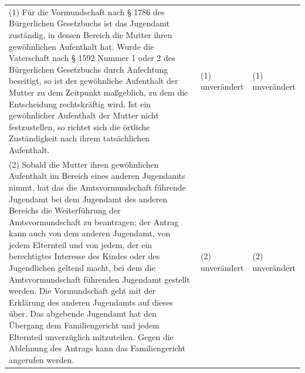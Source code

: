 \documentclass[10pt,a4paper,landscape]{article}
\begin{document}
\begin{longtable}{|L{8.2cm}|L{8.2cm}|L{8.2cm}|}
\hhline{|---|}
(1) Für die Vormundschaft nach \S{} 1786 des  \newline Bürgerlichen Gesetzbuchs ist das  \newline Jugendamt zuständig, in dessen Bereich  \newline die Mutter ihren gewöhnlichen Aufenthalt  \newline hat. Wurde die Vaterschaft nach \S{} 1592  \newline Nummer 1 oder 2 des Bürgerlichen  \newline Gesetzbuchs durch Anfechtung beseitigt,  \newline so ist der gewöhnliche Aufenthalt der  \newline Mutter zu dem Zeitpunkt maßgeblich, zu  \newline dem die Entscheidung rechtskräftig wird.  \newline Ist ein gewöhnlicher Aufenthalt der Mutter  \newline nicht festzustellen, so richtet sich die  \newline örtliche Zuständigkeit nach ihrem  \newline tatsächlichen Aufenthalt. & (1) unverändert & (1) unverändert \\
\hhline{|---|}
(2) Sobald die Mutter ihren gewöhnlichen  \newline Aufenthalt im Bereich eines anderen  \newline Jugendamts nimmt, hat das die  \newline Amtsvormundschaft führende Jugendamt  \newline bei dem Jugendamt des anderen Bereichs  \newline die Weiterführung der Amtsvormundschaft  \newline zu beantragen; der Antrag kann auch von  \newline dem anderen Jugendamt, von jedem  \newline Elternteil und von jedem, der ein  \newline berechtigtes Interesse des Kindes oder des  \newline Jugendlichen geltend macht, bei dem die  \newline Amtsvormundschaft führenden Jugendamt  \newline gestellt werden. Die Vormundschaft geht  \newline mit der Erklärung des anderen Jugendamts  \newline auf dieses über. Das abgebende  \newline Jugendamt hat den Übergang dem  \newline Familiengericht und jedem Elternteil  \newline unverzüglich mitzuteilen. Gegen die  \newline Ablehnung des Antrags kann das  \newline Familiengericht angerufen werden. & (2) unverändert & (2) unverändert \\

\end{longtable}
\end{document}
